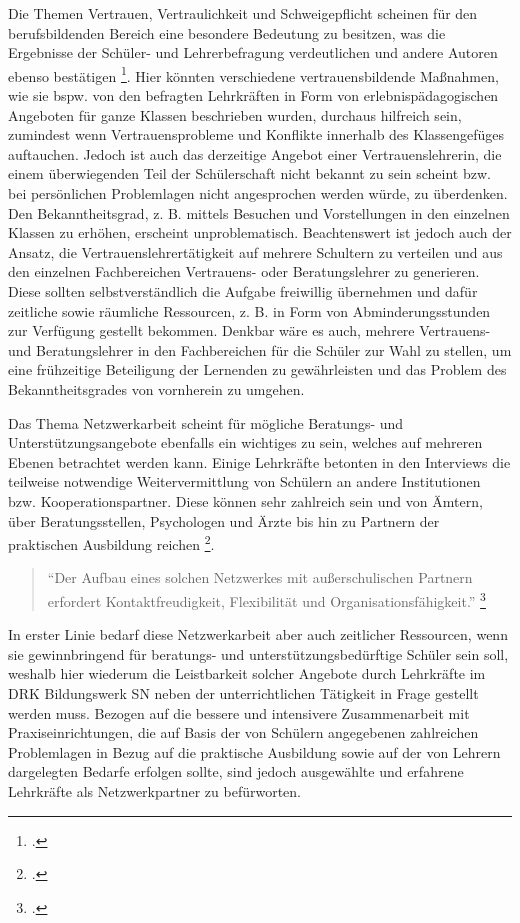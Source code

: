 Die Themen Vertrauen, Vertraulichkeit und Schweigepflicht scheinen für den berufsbildenden Bereich eine besondere Bedeutung zu besitzen, was die Ergebnisse der Schüler- und Lehrerbefragung verdeutlichen und andere Autoren ebenso bestätigen \footcite[vgl.][49]{Essers2012}. Hier könnten verschiedene vertrauensbildende Maßnahmen, wie sie bspw. von den befragten Lehrkräften in Form von erlebnispädagogischen Angeboten für ganze Klassen beschrieben wurden, durchaus hilfreich sein, zumindest wenn Vertrauensprobleme und Konflikte innerhalb des Klassengefüges auftauchen. Jedoch ist auch das derzeitige Angebot einer Vertrauenslehrerin, die einem überwiegenden Teil der Schülerschaft nicht bekannt zu sein scheint bzw. bei persönlichen Problemlagen nicht angesprochen werden würde, zu überdenken. Den Bekanntheitsgrad, z. B. mittels Besuchen und Vorstellungen in den einzelnen Klassen zu erhöhen, erscheint unproblematisch. Beachtenswert ist jedoch auch der Ansatz, die Vertrauenslehrertätigkeit auf mehrere Schultern zu verteilen und aus den einzelnen Fachbereichen Vertrauens- oder Beratungslehrer zu generieren. Diese sollten selbstverständlich die Aufgabe freiwillig übernehmen und dafür zeitliche sowie räumliche Ressourcen, z. B. in Form von Abminderungsstunden zur Verfügung gestellt bekommen. Denkbar wäre es auch, mehrere Vertrauens- und Beratungslehrer in den Fachbereichen für die Schüler zur Wahl zu stellen, um eine frühzeitige Beteiligung der Lernenden zu gewährleisten und das Problem des Bekanntheitsgrades von vornherein zu umgehen. 

Das Thema Netzwerkarbeit scheint für mögliche Beratungs- und Unterstützungsangebote ebenfalls ein wichtiges zu sein, welches auf mehreren Ebenen betrachtet werden kann. Einige Lehrkräfte betonten in den Interviews die teilweise notwendige Weitervermittlung von Schülern an andere Institutionen bzw. Kooperationspartner. Diese können sehr zahlreich sein und von Ämtern, über Beratungsstellen, Psychologen und Ärzte bis hin zu Partnern der praktischen Ausbildung reichen \footcites[vgl.][49ff]{Essers2012}[vgl.][21]{NiedersaechsischesKultusministerium2004}.

\begin{quotation}
\noindent
"`Der Aufbau eines solchen Netzwerkes mit außerschulischen Partnern erfordert Kontaktfreudigkeit, Flexibilität und Organisationsfähigkeit."' \footcite[21]{NiedersaechsischesKultusministerium2004}
\end{quotation}

\noindent
In erster Linie bedarf diese Netzwerkarbeit aber auch zeitlicher Ressourcen, wenn sie gewinnbringend für beratungs- und unterstützungsbedürftige Schüler sein soll, weshalb hier wiederum die Leistbarkeit solcher Angebote durch Lehrkräfte im DRK Bildungswerk SN neben der unterrichtlichen Tätigkeit in Frage gestellt werden muss. Bezogen auf die bessere und intensivere Zusammenarbeit mit Praxiseinrichtungen, die auf Basis der von Schülern angegebenen zahlreichen Problemlagen in Bezug auf die praktische Ausbildung sowie auf der von Lehrern dargelegten Bedarfe erfolgen sollte, sind jedoch ausgewählte und erfahrene Lehrkräfte als  Netzwerkpartner zu befürworten.

